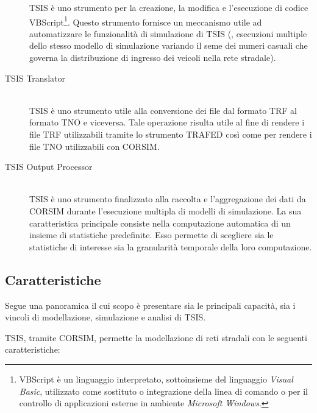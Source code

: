 \begin{description}
\acs{TSIS}  è uno strumento per la creazione, la modifica e l'esecuzione di codice \acs{VBScript}\footnote{\acf{VBScript} è un linguaggio interpretato, sottoinsieme del linguaggio \emph{Visual Basic}, utilizzato come sostituto o integrazione della linea di comando o per il controllo di applicazioni esterne in ambiente \emph{Microsoft Windows}.}. Questo strumento fornisce un meccanismo utile ad automatizzare le funzionalità di simulazione di \acs{TSIS} (\eg{}, esecuzioni multiple dello stesso modello di simulazione variando il seme dei numeri casuali che governa la distribuzione di ingresso dei veicoli nella rete stradale).
\item[TSIS Translator] \hfill \\
\acs{TSIS}  è uno strumento utile alla conversione dei file dal formato \acs{TRF} al formato \acs{TNO} e viceversa. Tale operazione risulta utile al fine di rendere i file \acs{TRF} utilizzabili tramite lo strumento \acs{TRAFED} così come per rendere i file \acs{TNO} utilizzabili con \acs{CORSIM}.
\item[TSIS Output Processor] \hfill \\
\acs{TSIS}  è uno strumento finalizzato alla raccolta e l'aggregazione dei dati da \acs{CORSIM} durante l'esecuzione multipla di modelli di simulazione. La sua caratteristica principale consiste nella computazione automatica di un insieme di statistiche predefinite. Esso permette di scegliere sia le statistiche di interesse sia la granularità temporale della loro computazione.
\end{description}

\subsection{Caratteristiche}
Segue una panoramica il cui scopo è presentare sia le principali capacità, sia i vincoli di modellazione, simulazione e analisi di \acs{TSIS}.

\acs{TSIS}, tramite \acs{CORSIM}, permette la modellazione di reti stradali con le seguenti caratteristiche:

